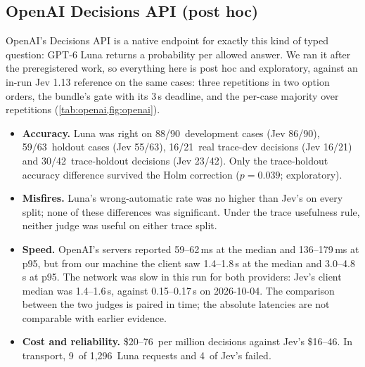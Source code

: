 \documentclass[11pt,letterpaper]{article}
\newcommand{\OaClientPfiftyHi}{1.8}
\newcommand{\OaClientPfiftyLo}{1.4}
\newcommand{\OaClientPninetyfiveHi}{4.8}
\newcommand{\OaClientPninetyfiveLo}{3.0}
\newcommand{\OaDevJevK}{86}
\newcommand{\OaDevJevN}{90}
\newcommand{\OaDevLunaK}{88}
\newcommand{\OaDevLunaN}{90}
\newcommand{\OaHoldoutJevK}{55}
\newcommand{\OaHoldoutJevN}{63}
\newcommand{\OaHoldoutLunaK}{59}
\newcommand{\OaHoldoutLunaN}{63}
\newcommand{\OaInvalid}{9}
\newcommand{\OaInvalidJev}{4}
\newcommand{\OaJevClientHi}{1.6}
\newcommand{\OaJevClientLo}{1.4}
\newcommand{\OaJevEarlierDate}{2026-10-04}
\newcommand{\OaJevEarlierHi}{0.17}
\newcommand{\OaJevEarlierLo}{0.15}
\newcommand{\OaJevUsdHi}{46}
\newcommand{\OaJevUsdLo}{16}
\newcommand{\OaRequests}{1{,}296}
\newcommand{\OaServerPfiftyHi}{62}
\newcommand{\OaServerPfiftyLo}{59}
\newcommand{\OaServerPninetyfiveHi}{179}
\newcommand{\OaServerPninetyfiveLo}{136}
\newcommand{\OaTrHoldHolm}{0.039}
\newcommand{\OaTraceDevJevK}{16}
\newcommand{\OaTraceDevJevN}{21}
\newcommand{\OaTraceDevLunaK}{16}
\newcommand{\OaTraceDevLunaN}{21}
\newcommand{\OaTraceHoldoutJevK}{23}
\newcommand{\OaTraceHoldoutJevN}{42}
\newcommand{\OaTraceHoldoutLunaK}{30}
\newcommand{\OaTraceHoldoutLunaN}{42}
\newcommand{\OaUsdHi}{76}
\newcommand{\OaUsdLo}{20}
\begin{document}
\subsection{OpenAI Decisions API (post hoc)}\label{sec:openai}
OpenAI's Decisions API is a native endpoint for exactly this kind of typed question: GPT-6 Luna returns a probability per
allowed answer. We ran it after the preregistered work, so everything here is post hoc and exploratory, against an
in-run Jev 1.13 reference on the same cases: three repetitions in two option orders, the bundle's gate with its
3\,s deadline, and the per-case majority over repetitions (\cref{tab:openai,fig:openai}).
\begin{itemize}
  \item \textbf{Accuracy.} Luna was right on \OaDevLunaK/\OaDevLunaN\ development cases (Jev \OaDevJevK/\OaDevJevN),
    \OaHoldoutLunaK/\OaHoldoutLunaN\ holdout cases (Jev \OaHoldoutJevK/\OaHoldoutJevN), \OaTraceDevLunaK/\OaTraceDevLunaN\
    real trace-dev decisions (Jev \OaTraceDevJevK/\OaTraceDevJevN) and \OaTraceHoldoutLunaK/\OaTraceHoldoutLunaN\
    trace-holdout decisions (Jev \OaTraceHoldoutJevK/\OaTraceHoldoutJevN). Only the trace-holdout accuracy difference
    survived the Holm correction ($p = \OaTrHoldHolm$; exploratory).
  \item \textbf{Misfires.} Luna's wrong-automatic rate was no higher than Jev's on every split; none of these differences
    was significant. Under the trace usefulness rule, neither judge was useful on either trace split.
  \item \textbf{Speed.} OpenAI's servers reported \OaServerPfiftyLo--\OaServerPfiftyHi\,ms at the median and
    \OaServerPninetyfiveLo--\OaServerPninetyfiveHi\,ms at p95, but from our machine the client saw
    \OaClientPfiftyLo--\OaClientPfiftyHi\,s at the median and \OaClientPninetyfiveLo--\OaClientPninetyfiveHi\,s at p95.
    The network was slow in this run for both providers: Jev's client median was \OaJevClientLo--\OaJevClientHi\,s,
    against \OaJevEarlierLo--\OaJevEarlierHi\,s on \OaJevEarlierDate. The comparison between the two judges is paired in
    time; the absolute latencies are not comparable with earlier evidence.
  \item \textbf{Cost and reliability.} \$\OaUsdLo--\OaUsdHi\ per million decisions against Jev's \$\OaJevUsdLo--\OaJevUsdHi.
    In transport, \OaInvalid\ of \OaRequests\ Luna requests and \OaInvalidJev\ of Jev's failed.
\end{itemize}
\end{document}
